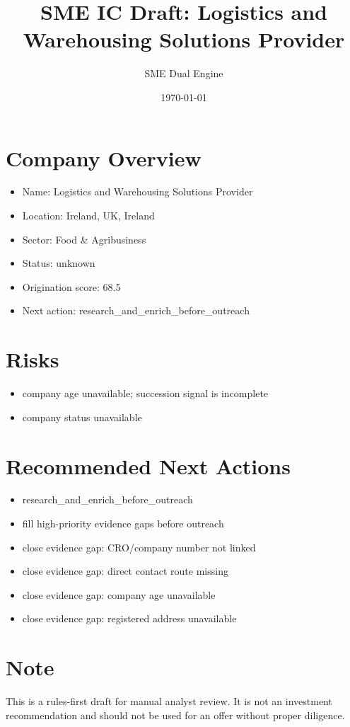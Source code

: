 \documentclass[11pt,a4paper]{article}
\title{SME IC Draft: Logistics and Warehousing Solutions Provider}
\author{SME Dual Engine}
\date{\today}
\begin{document}
\maketitle
\section*{Company Overview}
\begin{itemize}[leftmargin=1.4em]
\item Name: Logistics and Warehousing Solutions Provider
\item Location: Ireland, UK, Ireland
\item Sector: Food \& Agribusiness
\item Status: unknown
\item Origination score: 68.5
\item Next action: research\_and\_enrich\_before\_outreach
\end{itemize}
\section*{Risks}
\begin{itemize}[leftmargin=1.4em]
\item company age unavailable; succession signal is incomplete
\item company status unavailable
\end{itemize}
\section*{Recommended Next Actions}
\begin{itemize}[leftmargin=1.4em]
\item research\_and\_enrich\_before\_outreach
\item fill high-priority evidence gaps before outreach
\item close evidence gap: CRO/company number not linked
\item close evidence gap: direct contact route missing
\item close evidence gap: company age unavailable
\item close evidence gap: registered address unavailable
\end{itemize}
\section*{Note}
This is a rules-first draft for manual analyst review. It is not an investment
recommendation and should not be used for an offer without proper diligence.
\end{document}
